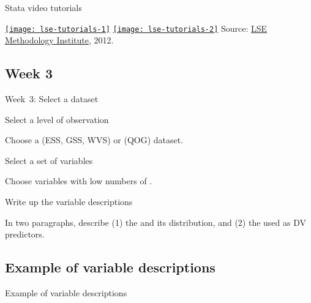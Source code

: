 \documentclass[t]{beamer}
\begin{document}
	\begin{frame}[c]{Stata video tutorials}
    
        \href{https://www.youtube.com/watch?v=AlEmUqMBx4A&feature=plcp}{\texttt{[image: lse-tutorials-1]}}%
		\hfill%
		\href{https://www.youtube.com/watch?v=0C_Hlh_jNq8&feature=plcp}{\texttt{[image: lse-tutorials-2]}}%
		\vfill%
		Source: \href{https://www.youtube.com/user/MethodologyLSE/videos?query=stata}{LSE Methodology Institute}, 2012.

    \end{frame}


    \subsection*{Week 3}

	\begin{frame}[c]{Week~3: Select a dataset}
		
		\begin{block}{Select a level of observation}

			Choose a  (ESS, GSS, WVS) or  (QOG) dataset.

		\end{block}

		\begin{block}{Select a set of variables}

			Choose variables with low numbers of .

		\end{block}

		\begin{alertblock}{Write up the variable descriptions}

			In two paragraphs, describe (1) the  and its distribution, and (2) the  used as DV predictors.

		\end{alertblock}
				
	\end{frame}

	\subsection*{Example of variable descriptions}
	\begin{frame}[c]{Example of variable descriptions}
		
		\begin{quote}
			
		\end{quote}

	\end{frame}
\end{document}
